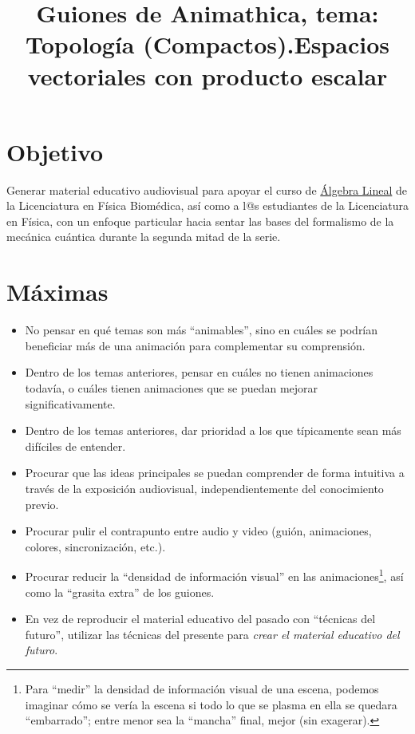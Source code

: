\documentclass[12pt,dvipsnames]{article}
\title{Guiones de Animathica, tema: Topología (Compactos).}
\numberwithin{equation}{section}
\begin{document}
\title{Espacios vectoriales con producto escalar}
\date{}
\maketitle

\section{Objetivo}
Generar material educativo audiovisual para apoyar el curso de \href{http://www.fciencias.unam.mx/licenciatura/asignaturas/2016/1330}{Álgebra Lineal} de la Licenciatura en Física Biomédica, así como a l@s estudiantes de la Licenciatura en Física, con un enfoque particular hacia sentar las bases del formalismo de la mecánica cuántica durante la segunda mitad de la serie.

\section{Máximas}

\begin{itemize}
    \item No pensar en qué temas son más ``animables'', sino en cuáles se podrían beneficiar más de una animación para complementar su comprensión.
    \item Dentro de los temas anteriores, pensar en cuáles no tienen animaciones todavía, o cuáles tienen animaciones que se puedan mejorar significativamente.
    \item Dentro de los temas anteriores, dar prioridad a los que típicamente sean más difíciles de entender.
    \item Procurar que las ideas principales se puedan comprender de forma intuitiva a través de la exposición audiovisual, independientemente del conocimiento previo.
    \item Procurar pulir el contrapunto entre audio y video (guión, animaciones, colores, sincronización, etc.).
    \item Procurar reducir la ``densidad de información visual'' en las animaciones\footnote{Para ``medir'' la densidad de información visual de una escena, podemos imaginar cómo se vería la escena si todo lo que se plasma en ella se quedara ``embarrado''; entre menor sea la ``mancha'' final, mejor (sin exagerar).}, así como la ``grasita extra'' de los guiones.
    \item En vez de reproducir el material educativo del pasado con ``técnicas del futuro'', utilizar las técnicas del presente para \emph{crear el material educativo del futuro}.
\end{itemize}
\end{document}
